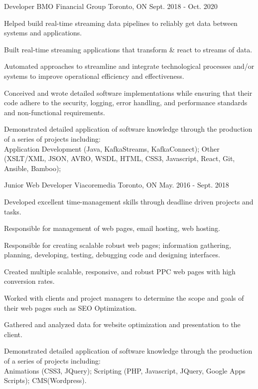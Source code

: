 \begin{cventries}
\cventry
{Developer} %
{BMO Financial Group} %
{Toronto, ON} %
{Sept. 2018 - Oct. 2020} %
{ %
\begin{cvitems}
\item {Helped build real-time streaming data pipelines to reliably get data between systems and applications.}
\item {Built real-time streaming applications that transform \& react to streams of data.}
\item {Automated approaches to streamline and integrate technological processes and/or systems to improve operational efficiency and effectiveness.}
\item {Conceived and wrote detailed software implementations while ensuring that their code adhere to the security, logging, error handling, and performance standards and non-functional requirements.}
\item {Demonstrated detailed application of software knowledge through the production of a series of projects including: \\Application Development (Java, KafkaStreams, KafkaConnect); Other (XSLT/XML, JSON, AVRO, WSDL, HTML, CSS3, Javascript, React, Git, Ansible, Bamboo);}
\end{cvitems}
}

\cventry
{Junior Web Developer} %
{Viacoremedia} %
{Toronto, ON} %
{May. 2016 - Sept. 2018} %
{ %
\begin{cvitems}
\item {Developed excellent time-management skills through deadline driven projects and tasks.}
\item {Responsible for management of web pages, email hosting, web hosting.}
\item {Responsible for creating scalable robust web pages; information gathering, planning, developing, testing, debugging code and designing interfaces.}
\item {Created multiple scalable, responsive, and robust PPC web pages with high conversion rates.}
\item {Worked with clients and project managers to determine the scope and goals of their web pages such as SEO Optimization.}
\item {Gathered and analyzed data for website optimization and presentation to the client.}
\item {Demonstrated detailed application of software knowledge through the production of a series of projects including: \\Animations (CSS3, JQuery); Scripting (PHP, Javascript, JQuery, Google Apps Scripts); CMS(Wordpress).}
\end{cvitems}
}

\end{cventries}